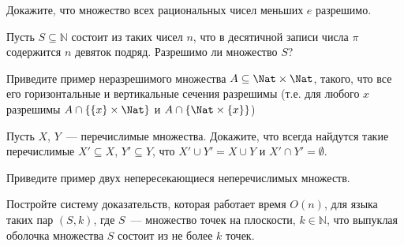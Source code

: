 \setcounter{curtask}{9}


\begin{task}
    Докажите, что множество всех рациональных чисел меньших $e$ разрешимо.
\end{task}

\begin{task}
    Пусть $S \subseteq \mathbb{N}$ состоит из таких чисел $n$, что в десятичной
    записи числа $\pi$ содержится $n$ девяток подряд. Разрешимо ли множество $S$?
\end{task}

\begin{task}
    Приведите пример неразрешимого множества $A \subseteq \Nat \times \Nat$,
    такого, что все его горизонтальные и вертикальные сечения
    разрешимы (т.е. для любого $x$ разрешимы $A \cap \{\{x\} \times \Nat\}$
    и $A \cap \{\Nat \times \{x\}\}$)
\end{task}

\begin{task}
    Пусть $X$, $Y$~--- перечислимые множества. Докажите, что всегда
    найдутся такие перечислимые $X' \subseteq X$, $Y' \subseteq Y$,
    что $X' \cup Y' = X \cup Y$ и $X' \cap Y' = \emptyset$.
\end{task}

\begin{task}
    Приведите пример двух непересекающиеся неперечислимых множеств.
\end{task}

\begin{task}
    Постройте систему доказательств, которая работает время $O(n)$, для языка таких
    пар $(S, k)$, где $S$~--- множество точек на плоскости, $k \in \mathbb{N}$, что
    выпуклая оболочка множества $S$ состоит из не более $k$ точек.
\end{task}
